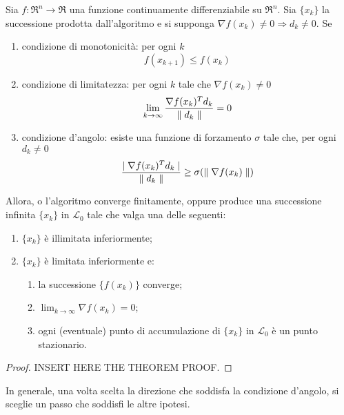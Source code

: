 \begin{theorem}
	\label{thm:convergence-condition-2}
	Sia $f:\Re^{n}\rightarrow\Re$ una funzione continuamente differenziabile su $\Re^{n}$. Sia $\{x_{k}\}$ la successione prodotta dall'algoritmo e si supponga $\nabla f(x_{k})\neq 0\Rightarrow d_{k}\neq 0$.
	Se
	\begin{enumerate}

		\item condizione di monotonicità:
		per ogni $k$
		\begin{equation}
		f(x_{k+1})\leq f(x_{k})
		\end{equation}

		\item condizione di limitatezza:
		per ogni $k$ tale che $\nabla f(x_{k})\neq 0$
		\begin{equation}
		\lim_{k\rightarrow\infty}\frac{\nabla f(x_{k})^{T}d_{k}}{\parallel d_{k} \parallel}=0
		\end{equation}

		\item condizione d'angolo:
		esiste una funzione di forzamento $\sigma$ tale che, per ogni $d_{k}\neq 0$
		\begin{equation}
		\frac{\mid \nabla f(x_{k})^{T}d_{k} \mid}{\parallel d_{k} \parallel}\geq\sigma(\parallel \nabla f(x_{k}) \parallel)
		\end{equation}
	\end{enumerate}

	Allora, o l'algoritmo converge finitamente, oppure produce una successione infinita $\{x_{k}\}$ in $\mathcal{L}_{0}$ tale che valga una delle seguenti:

	\begin{enumerate}
		\item $\{x_{k}\}$ è illimitata inferiormente;

		\item $\{x_{k}\}$ è limitata inferiormente e:
		\begin{enumerate}
			\item la successione $\{f(x_{k})\}$ converge;

			\item $\lim_{k\rightarrow\infty}\nabla f(x_{k})=0$;

			\item ogni (eventuale) punto di accumulazione di $\{x_{k}\}$ in $\mathcal{L}_{0}$ è un punto stazionario.
		\end{enumerate}
	\end{enumerate}

	\begin{proof}
		INSERT HERE THE THEOREM PROOF.
	\end{proof}
\end{theorem}

In generale, una volta scelta la direzione che soddisfa la condizione d'angolo, si sceglie un passo che soddisfi le altre ipotesi.
